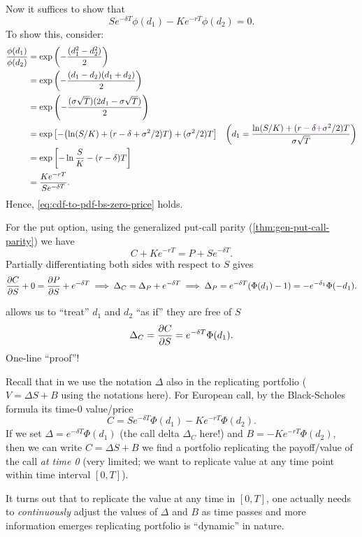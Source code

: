 \begin{enumerate}
\begin{pf}
Now it suffices to show that \begin{equation}
\label{eq:cdf-to-pdf-bs-zero-price}
Se^{-\delta T}\phi(d_1)-Ke^{-rT}\phi(d_2)=0.
\end{equation}
To show this, consider:
\begin{align*}
\frac{\phi(d_1)}{\phi(d_2)}&=\exp\qty(-\frac{(d_1^2-d_2^2)}{2})\\
&=\exp\qty(-\frac{(d_1-d_2)(d_1+d_2)}{2})\\
&=\exp\qty(-\frac{(\sigma\sqrt{T})(2d_1-\sigma\sqrt{T})}{2})\\
&=\exp\qty[-\qty(\ln(S/K)+(r-\delta+\sigma^2/2)T)+(\sigma^{2}/2)T]&
\qty(d_1=\frac{\ln(S/K)+(r-\delta{\color{violet}+}\sigma^2/2)T}{\sigma\sqrt{T}}) \\
&=\exp\qty[-\ln\frac{S}{K}-(r-\delta)T] \\
&=\frac{Ke^{-rT}}{Se^{-\delta T}}.
\end{align*}
Hence, \cref{eq:cdf-to-pdf-bs-zero-price} holds.

For the put option, using the generalized put-call parity
(\cref{thm:gen-put-call-parity}) we have
\[
C+Ke^{-rT}=P+Se^{-\delta T}.
\]
Partially differentiating both sides with respect to \(S\) gives
\[
\pdv{C}{S}+0=\pdv{P}{S}+e^{-\delta T}
\implies \Delta_C=\Delta_P+e^{-\delta T}
\implies \Delta_P=e^{-\delta T}(\Phi(d_1)-1)=-e^{-\delta_1}\Phi(-d_1).
\]
\end{pf}

\begin{mnemonic}
 allows us to ``treat'' \(d_1\) and
\(d_2\) ``as if'' they are free of \(S\) 
\[
\Delta_C=\pdv{C}{S}=e^{-\delta T}\Phi(d_1).
\]
One-line ``proof''!
\end{mnemonic}

\begin{note}
Recall that in  we use the notation \(\Delta\) also in
the replicating portfolio (\(V=\Delta S+B\) using the notations here).
For European call, by the Black-Scholes formula its time-0 value/price
\[
C=Se^{-\delta T}\Phi(d_1)-Ke^{-rT}\Phi(d_2).
\]
If we set \(\Delta=e^{-\delta T}\Phi(d_1)\) (the call delta \(\Delta_C\) here!)
and \(B=-Ke^{-rT}\Phi(d_2)\), then we can write \(C=\Delta S+B\)
 we find a portfolio replicating the payoff/value of the
call \emph{at time 0} (very limited; we want to replicate value at any time
point within time interval \([0,T]\)).

It turns out that to replicate the value at any time in \([0,T]\), one actually
needs to \emph{continuously} adjust the values of \(\Delta\) and \(B\) as time
passes and more information emerges  replicating portfolio
is ``dynamic'' in nature.
\end{note}


\end{enumerate}
